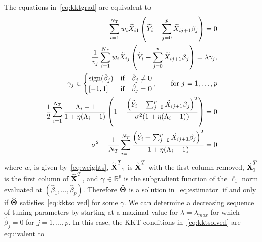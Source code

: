 The equations in~\eqref{eq:kktgrad} are equivalent to
\begin{equation}
\begin{aligned}
\sum_{i=1}^{N_T}w_i \widetilde{X}_{i1}\left(  \widetilde{Y}_i - \sum_{j=0}^{p}\widetilde{X}_{ij+1}\beta_j \right)  = 0\\
\frac{1}{v_j} \sum_{i=1}^{N_T}w_i \widetilde{X}_{ij}\left(  \widetilde{Y}_i - \sum_{j=0}^{p}\widetilde{X}_{ij+1}\beta_j \right) =  \lambda \gamma_j, \\
\gamma_j \in \begin{cases}
\textrm{{sign}}(\hat{\beta}_j) & \textrm{{if}} \quad \hat{\beta}_j \neq 0 \\
[-1,1] & \textrm{{if}}\quad \hat{\beta}_j = 0
\end{cases}, \qquad \textrm{{for }}j=1, \ldots, p   \\
\frac{1}{2} \sum_{i=1}^{N_T} \frac{\Lambda_i - 1}{1 + \eta(\Lambda_i - 1)} \left(1- \frac{\left(  \widetilde{Y}_i - \sum_{j=0}^{p}\widetilde{X}_{ij+1}\beta_j \right) ^2}{\sigma^2 (1+\eta(\Lambda_i-1))}  \right) = 0  \\
{\sigma^2} - \frac{1}{N_T}\sum_{i=1}^{N_T}\frac{\left(  \widetilde{Y}_i - \sum_{j=0}^{p}\widetilde{X}_{ij+1}\beta_j \right) ^2}{1 + \eta (\Lambda_i-1)} = 0
\end{aligned}\label{eq:kktsolved}
\end{equation}
where $w_i$ is given by~\eqref{eq:weights}, $\widetilde{\textbf{X}}^T_{-1}$ is $\widetilde{\textbf{X}}^T$ with the first column removed, $\widetilde{\textbf{X}}^T_1$ is the first column of $\widetilde{\textbf{X}}^T$, and $\boldsymbol{\gamma} \in \mathbb{R}^p$ is the subgradient function of the $\ell_1$ norm evaluated at $(\hat{\beta}_1, \ldots, \hat{\beta}_p)$. Therefore $\widehat{\boldsymbol{\Theta}}$ is a solution in~\eqref{eq:estimator} if and only if $\widehat{\boldsymbol{\Theta}}$ satisfies~\eqref{eq:kktsolved} for some $\gamma$. %
We can determine a decreasing sequence of tuning parameters by starting at a maximal value for $\lambda = \lambda_{max}$ for which $\hat{\beta}_j = 0$ for $j=1, \ldots, p$. In this case, the KKT conditions in~\eqref{eq:kktsolved} are equivalent to
